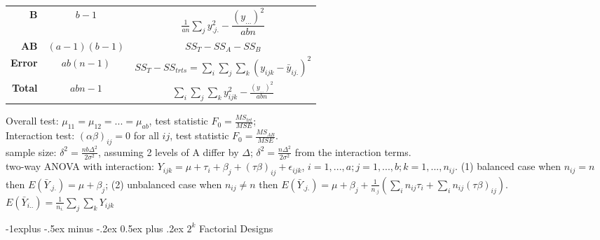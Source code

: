 \documentclass[10pt,landscape]{article}
\makeatletter
\renewcommand{\subsection}{\@startsection{subsection}{2}{0mm}%
                                {-1explus -.5ex minus -.2ex}%
                                {0.5ex plus .2ex}%
                                {\normalfont\normalsize\bfseries}}
\makeatother
\begin{document}
\begin{multicols}{3}
\begin{description}
\begin{center}
\begin{tabular}{r|cc}
                \textbf{B} & $b-1$ & $\frac{1}{an} \sum_j y_{.j.}^2 - \dfrac{(y_{...})^2}{abn}$ \\
                \textbf{AB} & $(a-1)(b-1)$ & $SS_T - SS_A - SS_B$ \\
                \textbf{Error} & $ab(n-1)$ & $SS_T - SS_{trts}  = \sum_i \sum_j \sum_k (y_{ijk} - \bar{y}_{ij.})^2$ \\
                \hline
                \textbf{Total} & $abn-1$ & $\sum_i \sum_j \sum_k y_{ijk}^2 - \frac{(y_{...})^2}{abn}$ \\
            \end{tabular}
        \end{center}	
	Overall test: $\mu_{11} = \mu_{12} = ... = \mu_{ab}$, test statistic $F_0 = \frac{MS_{trt}}{MSE}$; \\
	Interaction test: $(\alpha\beta)_{ij} = 0$ for all $ij$, test statistic $F_0 = \frac{MS_{AB}}{MSE}$.\\
	sample size: $\delta^2 = \frac{nb\Delta^2}{2\sigma^2}$, assuming 2 levels of A differ by $\Delta$; $\delta^2 = \frac{n\Delta^2}{2\sigma^2}$ from the interaction terms. \\
	two-way ANOVA with interaction: $Y_{ijk} = \mu + \tau_i +\beta_j + (\tau \beta)_{ij} + \epsilon_{ijk}$, $i = 1, ..., a; j = 1,...,b; k = 1,..., n_{ij}$. (1) balanced case when $n_{ij} = n$ then $E(\bar{Y}_{.j.}) = \mu + \beta_j$; (2) unbalanced case when $n_{ij} \neq n$ then $E(\bar{Y}_{.j.}) = \mu + \beta_j + \frac{1}{n_{.j}} (\sum_i n_{ij} \tau_i + \sum_i n_{ij}(\tau\beta)_{ij})$. $E(\bar{Y}_{i..}) = \frac{1}{n_{i.}}\sum_j \sum_k Y_{ijk}$\\
	\end{description}
	
\subsection{$2^k$ Factorial Designs}


\end{multicols}
\end{document}
